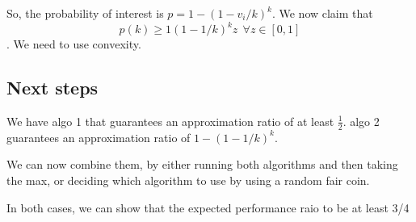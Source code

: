 So, the probability of interest is $p = 1 - (1 - v_i/k)^k$. We now claim that 
$$p(k) \geq 1(1 - 1/k)^k z~~\forall z \in [0, 1]$$. We need to use convexity.


\subsection{Next steps}
We have algo 1 that guarantees an approximation ratio of at least $\frac{1}{2}$.
algo 2 guarantees an approximation ratio of $1 - (1 - 1/k)^k$. 

We can now combine them, by either running both algorithms and then taking the
max, or deciding which algorithm to use by using a random fair coin.

In both cases, we can show that the expected performance raio to be at least 3/4
